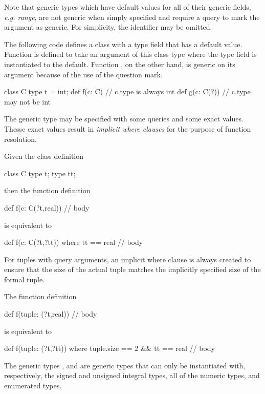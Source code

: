 Note that generic types which have default values for all of their
generic fields, \emph{e.g. range}, are not generic when simply
specified and require a query to mark the argument as generic.  For
simplicity, the identifier may be omitted.
\begin{example}
The following code defines a class with a type field that has a
default value.  Function  is defined to take an argument of
this class type where the type field is instantiated to the default.
Function , on the other hand, is generic on its argument
because of the use of the question mark.
\begin{chapel}
class C {
  type t = int;
}
def f(c: C) {
  // c.type is always int
}
def g(c: C(?)) {
  // c.type may not be int
}
\end{chapel}
\end{example}

The generic type may be specified with some queries and some exact
values.  Thesse exact values result in \emph{implicit where clauses}
for the purpose of function resolution.
\begin{example}
Given the class definition
\begin{chapel}
class C {
  type t;
  type tt;
}
\end{chapel}
then the function definition
\begin{chapel}
def f(c: C(?t,real)) {
  // body
}
\end{chapel}
is equivalent to
\begin{chapel}
def f(c: C(?t,?tt)) where tt == real {
  // body
}
\end{chapel}
\end{example}
For tuples with query arguments, an implicit where clause is always
created to ensure that the size of the actual tuple matches the
implicitly specified size of the formal tuple.
\begin{example}
The function definition
\begin{chapel}
def f(tuple: (?t,real)) {
  // body
}
\end{chapel}
is equivalent to
\begin{chapel}
def f(tuple: (?t,?tt)) where tuple.size == 2 && tt == real {
  // body
}
\end{chapel}
\end{example}

The generic types ,  and 
are generic types that can only be instantiated with, respectively, the
signed and unsigned integral types, all of the numeric types, and
enumerated types.

